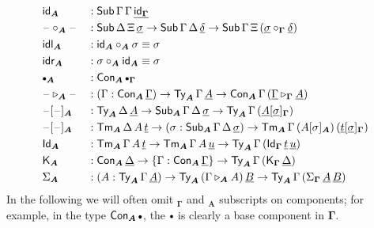 \documentclass[12pt,a4paper,twoside,openany]{book}
\theoremstyle{remark}
\theoremstyle{definition}
\theoremstyle{theorem}
\newcommand{\ms}[1]{\mathsf{#1}}
\newcommand{\bs}[1]{\boldsymbol{#1}}
\newcommand{\id}{\mathsf{id}}
\newcommand{\Con}{\mathsf{Con}}
\newcommand{\Sub}{\mathsf{Sub}}
\newcommand{\Tm}{\mathsf{Tm}}
\newcommand{\Ty}{\mathsf{Ty}}
\newcommand{\Id}{\mathsf{Id}}
\newcommand{\blank}{\mathord{\hspace{1pt}\text{--}\hspace{1pt}}}
\newcommand{\ra}{\rightarrow}
\newcommand{\ext}{\triangleright}
\newcommand{\emptycon}{\scaleobj{.75}\bullet}
\newcommand{\K}{\mathsf{K}}
\newcommand{\bGamma}{\bs{\Gamma}}
\newcommand{\bA}{\bs{A}}
\newcommand{\ul}[1]{\underline{#1}}
\newcommand{\ulGamma}{\ul{\Gamma}}
\newcommand{\ulDelta}{\ul{\Delta}}
\newcommand{\uldelta}{\ul{\delta}}
\newcommand{\ulsigma}{\ul{\sigma}}
\newcommand{\ult}{\ul{t}}
\newcommand{\ulu}{\ul{u}}
\newcommand{\ulA}{\ul{A}}
\newcommand{\ulB}{\ul{B}}
\begin{document}
\begin{alignat*}{3}
  & \id_{\bA} &&: \Sub\,\Gamma\,\Gamma\,\ul{\id_{\bGamma}}\\
  & \blank\circ_{\bA}\blank &&: \Sub\,\Delta\,\Xi\,\ulsigma \to \Sub\,\Gamma\,\Delta\,\uldelta
    \to \Sub\,\Gamma\,\Xi\,(\ulsigma \circ_{\bGamma} \uldelta)\\
  & \ms{idl}_{\bA} &&:  \id_{\bA} \circ_{\bA} \sigma \equiv \sigma \\
  & \ms{idr}_{\bA} &&:  \sigma \circ_{\bA} \id_{\bA} \equiv \sigma \\
  & \emptycon_{\bA} && : \Con_{\bA}\,\emptycon_{\bGamma}\\
  & \blank\ext_{\bA}\blank && : (\Gamma : \Con_{\bA}\,\ulGamma)\ra \Ty_{\bA}\,\Gamma\,\ulA \ra
                     \Con_{\bA}\,\Gamma\,(\ulGamma \ext_{\bGamma} \ulA)\\
  & \blank[\blank]_{\bA} && : \Ty_{\bA}\,\Delta\,\ulA \ra \Sub_{\bA}\,\Gamma\,\Delta\,\ulsigma
                     \ra \Ty_{\bA}\,\Gamma\, (\ulA[\ulsigma]_{\bGamma})\\
  & \blank[\blank]_{\bA} && : \Tm_{\bA}\,\Delta\,A\,\ult \ra (\sigma : \Sub_{\bA}\,\Gamma\,\Delta\,\ulsigma)
                        \ra \Tm_{\bA}\,\Gamma\, (A[\sigma]_{\bA})\,(\ult[\ulsigma]_{\bGamma})\\
  &\Id_{\bA} &&: \Tm_{\bA}\,\Gamma\,A\,\ult \to \Tm_{\bA}\,\Gamma\,A\,\ulu \to \Ty_{\bA}\,\Gamma\,(\Id_{\bGamma}\,\ult\,\ulu)\\
  &\K_{\bA} &&: \Con_{\bA}\,\ulDelta \to \{\Gamma : \Con_{\bA}\,\ulGamma\} \to \Ty_{\bA}\,\Gamma\,(\K_{\bGamma}\,\ulDelta)\\
  &\Sigma_{\bA} &&: (A : \Ty_{\bA}\,\Gamma\,\ulA) \to \Ty_{\bA}\,(\Gamma \ext_{\bA} A)\,\ulB \to
                   \Ty_{\bA}\,\Gamma\,(\Sigma_{\bGamma}\,\ulA\,\ulB)
\end{alignat*}
In the following we will often omit $_{\bGamma}$ and $_{\bA}$ subscripts on
components; for example, in the type $\Con_{\bA}\,\emptycon$, the $\emptycon$ is
clearly a base component in $\bGamma$.
\end{document}

